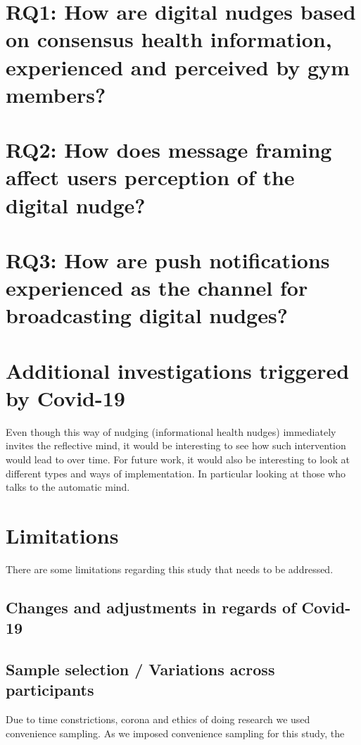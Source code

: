 \section{RQ1: How are digital nudges based on consensus health information, experienced and perceived by gym members?}



\section{RQ2: How does message framing affect users perception of the digital nudge?}

\section{RQ3: How are push notifications experienced as the channel for broadcasting digital nudges?}


\section{Additional investigations triggered by Covid-19}

Even though this way of nudging (informational health nudges) immediately invites the reflective mind, it would be interesting to see how such intervention would lead to over time.  For future work, it would also be interesting to look at different types and ways of implementation. In particular looking at those who talks to the automatic mind. 

\section{Limitations}
There are some limitations regarding this study that needs to be addressed.

\subsection{Changes and adjustments in regards of Covid-19 }

\subsection{Sample selection / Variations across participants}
Due to time constrictions, corona and ethics of doing research we used convenience sampling. As we imposed convenience sampling for this study, the 

